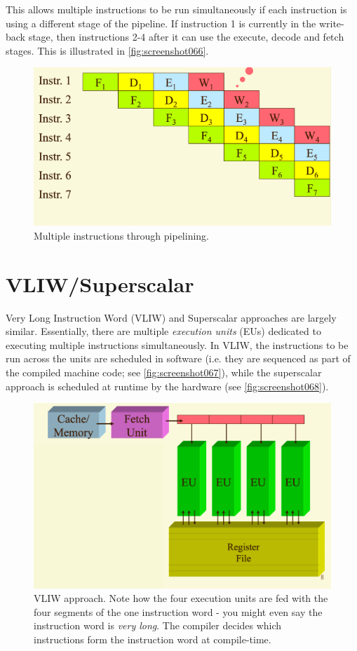 This allows multiple instructions to be run simultaneously if each instruction is using a different stage of the pipeline. If instruction 1 is currently in the write-back stage, then instructions 2-4 after it can use the execute, decode and fetch stages. This is illustrated in \autoref{fig:screenshot066}.

\begin{figure}
\centering
\includegraphics[width=0.7\linewidth]{figures/screenshot066}
\caption{Multiple instructions through pipelining.}
\label{fig:screenshot066}
\end{figure}

\section{VLIW/Superscalar}
Very Long Instruction Word (VLIW) and Superscalar approaches are largely similar. Essentially, there are multiple \textit{execution units} (EUs) dedicated to executing multiple instructions simultaneously. In VLIW, the instructions to be run across the units are scheduled in software (i.e. they are sequenced as part of the compiled machine code; see \autoref{fig:screenshot067}), while the superscalar approach is scheduled at runtime by the hardware (see \autoref{fig:screenshot068}).

\begin{figure}
\centering
\includegraphics[width=0.7\linewidth]{figures/screenshot067}
\caption[VLIW approach.]{VLIW approach. Note how the four execution units are fed with the four segments of the one instruction word - you might even say the instruction word is \textit{very long}. The compiler decides which instructions form the instruction word at compile-time.}
\label{fig:screenshot067}
\end{figure}

